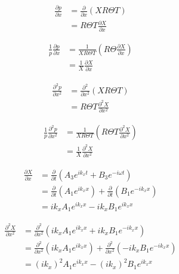 \begin{align*}
    \frac{\partial p}{\partial x} 
    &=
    \frac{\partial }{\partial x}  \left( XR\Theta T \right) \\
    &=
    R\Theta T \frac{\partial X}{\partial x}  
\end{align*}


\begin{align*}
    \frac{1}{p}\frac{\partial p}{\partial x} 
    &=
    \frac{ 1}{X R \Theta T}  \left( R\Theta\frac{\partial X}{\partial x} \right) \\
    &=\frac{ 1}{ X}\frac{\partial X}{\partial x}  
\end{align*}

\begin{align*}
    \frac{\partial^2 p}{\partial x^2} 
    &=
    \frac{\partial^2 }{\partial x^2}  \left( XR\Theta T \right) \\
    &=
    R\Theta T \frac{\partial^2 X}{\partial x^2}  
\end{align*}


\begin{align*}
    \frac{1}{p}\frac{\partial^2 p}{\partial x^2} 
    &=
    \frac{ 1}{X R \Theta T}  \left( R\Theta T \frac{\partial^2 X}{\partial x^2} \right) \\
    &=\frac{ 1}{ X}\frac{\partial^2 X}{\partial x^2}  
\end{align*}

\begin{align*}
    \frac{\partial X}{\partial x} &=
    \frac{\partial}{\partial t}
        \left( 
        A_3 e^{i k_x t} + B_3 e^{-i \omega t}
    \right)  \\
    &=
    \frac{\partial}{\partial t} \left(A_1 e^{i k_x x}  \right) +
    \frac{\partial}{\partial t} \left(B_1 e^{-i k_x x }  \right)\\ 
    &= i k_x A_1 e^{i k_x x } - i k_x B_1 e^{i k_x x} 
\end{align*}

\begin{align*}
    \frac{\partial^2 X}{\partial x^2} &=
    \frac{\partial^2}{\partial x^2}
        \left( 
        i k_x A_1 e^{i k_x x} + i k_x B_1 e^{-i k_x x}
    \right)  \\
    &=
    \frac{\partial^2}{\partial x^2} \left(i k_x A_1 e^{i k_x x}  \right) +
    \frac{\partial^2}{\partial x^2} \left(- i k_x B_1 e^{-i k_x x}  \right)\\ 
    &= (i k_x)^2 A_1 e^{i k_x x} - (i k_x)^2 B_1 e^{i k_x x} 
\end{align*}

